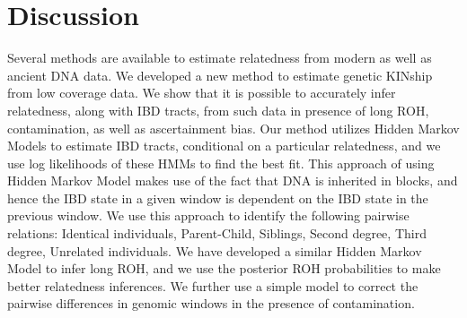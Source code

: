 \documentclass[12pt, letterpaper]{article}
\begin{document}
\section{Discussion}\label{discussion}

Several methods are available to estimate relatedness from modern as well as ancient DNA data. We developed a new method to estimate genetic KINship from low coverage data. We show that it is possible to accurately infer relatedness, along with IBD tracts, from such data in presence of long ROH, contamination, as well as ascertainment bias. Our method utilizes Hidden Markov Models to estimate IBD tracts, conditional on a particular relatedness, and we use log likelihoods of these HMMs to find the best fit. This approach of using Hidden Markov Model makes use of the fact that DNA is inherited in blocks, and hence the IBD state in a given window is dependent on the IBD state in the previous window. We use this approach to identify the following pairwise relations: Identical individuals, Parent-Child, Siblings, Second degree, Third degree, Unrelated individuals. We have developed a similar Hidden Markov Model to infer long ROH, and we use the posterior ROH probabilities to make better relatedness inferences. We further use a simple model to correct the pairwise differences in genomic windows in the presence of contamination. 
\end{document}
